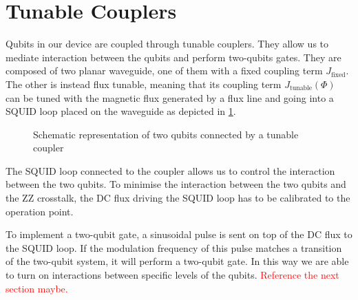 \section{Tunable Couplers}
\label{sec:tunable_couplers}

Qubits in our device are coupled through tunable couplers.
They allow us to mediate interaction between the qubits and perform two-qubits gates.
They are composed of two planar waveguide, one of them with a fixed coupling term $J_{\text{fixed}}$.
The other is instead flux tunable, meaning that its coupling term $J_{\text{tunable}}(\Phi)$ can be tuned with the magnetic flux generated by a flux line and going into a SQUID loop placed on the waveguide as depicted in \cref{fig:tun_coupl}.

\begin{figure}
    \centering
    
    \vspace{-1cm}
    \caption{Schematic representation of two qubits connected by a tunable coupler}
    \label{fig:tun_coupl}
\end{figure}

The SQUID loop connected to the coupler allows us to control the interaction between the two qubits.
To minimise the interaction between the two qubits and the ZZ crosstalk, the DC flux driving the SQUID loop has to be calibrated to the operation point.

To implement a two-qubit gate, a sinusoidal pulse is sent on top of the DC flux to the SQUID loop.
If the modulation frequency of this pulse matches a transition of the two-qubit system, it will perform a two-qubit gate.
In this way we are able to turn on interactions between specific levels of the qubits.
\textcolor{red}{Reference the next section maybe.}
